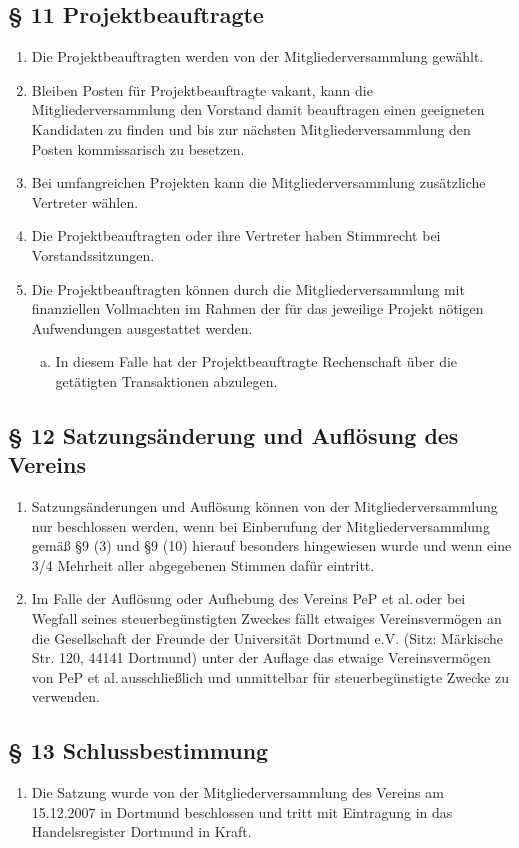 \documentclass[fontsize=12pt, paper=a4, DIV14, parskip]{scrreprt}
\begin{document}
\subsection{\S{} 11 Projektbeauftragte}

\begin{enumerate}[\qquad(1)]
	\item Die Projektbeauftragten werden von der Mitgliederversammlung gewählt.
	\item Bleiben Posten für Projektbeauftragte vakant, kann die Mitgliederversammlung den Vorstand damit beauftragen einen geeigneten Kandidaten zu finden und bis zur nächsten Mitgliederversammlung den Posten kommissarisch zu besetzen.
 	\item Bei umfangreichen Projekten kann die Mitgliederversammlung zusätzliche Vertreter wählen.
	\item Die Projektbeauftragten oder ihre Vertreter haben Stimmrecht bei Vorstandssitzungen.
	\item Die Projektbeauftragten können durch die Mitgliederversammlung mit finanziellen Vollmachten im Rahmen der für das jeweilige Projekt nötigen Aufwendungen ausgestattet werden.
		\begin{enumerate}[(a)]\itemsep-12pt
			\item In diesem Falle hat der Projektbeauftragte Rechenschaft über die getätigten Transaktionen abzulegen.
		\end{enumerate}
\end{enumerate}

\subsection{\S{} 12 Satzungsänderung und Auflösung des Vereins}

\begin{enumerate}[\qquad(1)]
	\item Satzungsänderungen und Auflösung können von der Mitgliederversammlung nur beschlossen werden, wenn bei Einberufung der Mitgliederversammlung gemäß §9 (3) und §9 (10) hierauf besonders hingewiesen wurde und wenn eine 3/4 Mehrheit aller abgegebenen Stimmen dafür eintritt.
	\item Im Falle der Auflösung oder Aufhebung des Vereins \glqq PeP et al.\grqq$\,$oder bei Wegfall seines steuerbegünstigten Zweckes fällt etwaiges Vereinsvermögen an die Gesellschaft der Freunde der Universität Dortmund e.V. (Sitz: Märkische Str. 120, 44141 Dortmund) unter der Auflage das etwaige Vereinsvermögen von \glqq PeP et al.\grqq$\,$ausschließlich und unmittelbar für steuerbegünstigte Zwecke zu verwenden.
\end{enumerate}

\subsection{\S{} 13 Schlussbestimmung}

\begin{enumerate}[\qquad(1)]
	\item Die Satzung wurde von der Mitgliederversammlung des Vereins am 15.12.2007 in Dortmund beschlossen und tritt mit Eintragung in das Handelsregister Dortmund in Kraft.
\end{enumerate}
\end{document}

